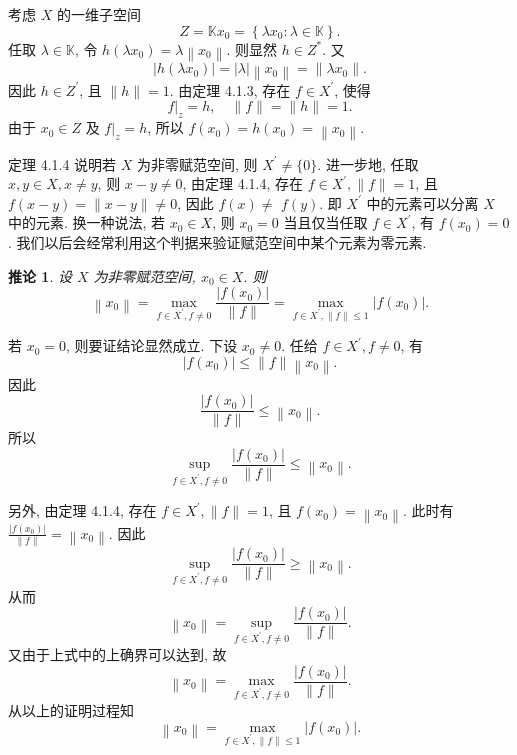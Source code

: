 \documentclass[openany]{ctexbook}
\makeatletter
\theoremstyle{kaiti}
\newtheorem{corollary}{推论}[section]
\theoremstyle{normal}
\renewenvironment{proof}[1][\proofname]{\par
    \pushQED{\qed}%
    \normalfont \topsep6\p@\@plus6\p@\relax
    \trivlist
    \item\relax
    {\heiti #1}\hspace{2\labelsep}\ignorespaces
  }{%
    \popQED\endtrivlist\@endpefalse
  }
\makeatother
\begin{document}
\begin{proof}
考虑 $X$ 的一维子空间
$$
Z=\mathbb{K} x_0=\left\{\lambda x_0: \lambda \in \mathbb{K}\right\}.
$$
任取 $\lambda \in \mathbb{K}$, 令 $h\left(\lambda x_0\right)=\lambda\left\|x_0\right\|$. 则显然 $h \in Z^{*}$. 又
$$
\left|h\left(\lambda x_0\right)\right|=|\lambda|\left\|x_0\right\|=\left\|\lambda x_0\right\|.
$$
因此 $h \in Z^{\prime}$, 且 $\|h\|=1$. 由定理 4.1.3, 存在 $f \in X^{\prime}$, 使得
$$
\left.f\right|_{z}=h, \quad\|f\|=\|h\|=1.
$$
由于 $x_0 \in Z$ 及 $\left.f\right|_{z}=h$, 所以 $f\left(x_0\right)=h\left(x_0\right)=\left\|x_0\right\|$.
\end{proof}

定理 4.1.4 说明若 $X$ 为非零赋范空间, 则 $X^{\prime} \neq\{0\}$. 进一步地, 任取 $x, y \in X, x \neq y$, 则 $x-y \neq 0$, 由定理 4.1.4, 存在 $f \in X^{\prime},\|f\|=1$, 且 $f(x-y)=\|x-y\| \neq 0$, 因此 $f(x) \neq$ $f(y)$. 即 $X^{\prime}$ 中的元素可以分离 $X$ 中的元素. 换一种说法, 若 $x_0 \in X$, 则 $x_0=0$ 当且仅当任取 $f \in X^{\prime}$, 有 $f\left(x_0\right)=0$. 我们以后会经常利用这个判据来验证赋范空间中某个元素为零元素.

\begin{corollary}
设 $X$ 为非零赋范空间, $x_0 \in X$. 则
$$
\left\|x_0\right\|=\max_{f \in X^{\prime}, f \neq 0} \frac{\left|f\left(x_0\right)\right|}{\|f\|}=\max_{f \in X^{\prime},\|f\| \leqslant 1}\left|f\left(x_0\right)\right|.
$$
\end{corollary}

\begin{proof}
若 $x_0=0$, 则要证结论显然成立. 下设 $x_0 \neq 0$. 任给 $f \in X^{\prime}, f \neq 0$, 有
$$
\left|f\left(x_0\right)\right| \leqslant\|f\|\left\|x_0\right\|.
$$
因此
$$
\frac{\left|f\left(x_0\right)\right|}{\|f\|} \leqslant\left\|x_0\right\|.
$$
所以
$$
\sup_{f \in X^{\prime}, f \neq 0} \frac{\left|f\left(x_0\right)\right|}{\|f\|} \leqslant\left\|x_0\right\|.
$$

另外, 由定理 4.1.4, 存在 $f \in X^{\prime},\|f\|=1$, 且 $f\left(x_0\right)=\left\|x_0\right\|$. 此时有 $\frac{\left|f\left(x_0\right)\right|}{\|f\|}=\left\|x_0\right\|$. 因此
$$
\sup_{f \in X^{\prime}, f \neq 0} \frac{\left|f\left(x_0\right)\right|}{\|f\|} \geqslant\left\|x_0\right\|.
$$
从而
$$
\left\|x_0\right\|=\sup_{f \in X^{\prime}, f \neq 0} \frac{\left|f\left(x_0\right)\right|}{\|f\|}.
$$
又由于上式中的上确界可以达到, 故
$$
\left\|x_0\right\|=\max_{f \in X^{\prime}, f \neq 0} \frac{\left|f\left(x_0\right)\right|}{\|f\|}.
$$
从以上的证明过程知
$$
\left\|x_0\right\|=\max_{f \in X^{\prime},\|f\| \leqslant 1}\left|f\left(x_0\right)\right|.
$$
\end{proof}
\end{document}
